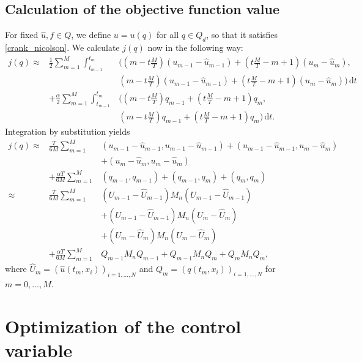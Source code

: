 \subsection{\label{subsectionCalculationOfTheObjectiveFunctionValue}Calculation of the objective function value}
For fixed $\hat{u},f\in Q$, we define $u=u(q)$ for all $q\in Q_d$, so that it satisfies \eqref{crank_nicolson}. We calculate $j(q)$ now in the following way:
\begin{eqnarray*}
j(q) \approx& \frac{1}{2}\sum_{m=1}^M\int_{t_{m-1}}^{t_m}&\bigg(\left(m-t\frac{M}{T}\right) \left(u_{m-1}-\hat{u}_{m-1}\right)+\left(t\frac{M}{T}-m+1\right) \left(u_{m}-\hat{u}_{m}\right),\\
&&\left(m-t\frac{M}{T}\right) \left(u_{m-1}-\hat{u}_{m-1}\right)+\left(t\frac{M}{T}-m+1\right) \left(u_{m}-\hat{u}_{m}\right)\bigg)\,\mathrm{d}t\\
&+ \frac{\alpha}{2}\sum_{m=1}^M\int_{t_{m-1}}^{t_m}&\bigg(\left(m-t\frac{M}{T}\right) q_{m-1}+\left(t\frac{M}{T}-m+1\right) q_{m},\\
&&\left(m-t\frac{M}{T}\right) q_{m-1}+\left(t\frac{M}{T}-m+1\right) q_{m}\bigg)\,\mathrm{d}t.
\end{eqnarray*}
Integration by substitution yields
\begin{eqnarray*}
j(q) \approx& \frac{T}{6M}\sum_{m=1}^M&\left(u_{m-1}-\hat{u}_{m-1},u_{m-1}-\hat{u}_{m-1}\right) + \left(u_{m-1}-\hat{u}_{m-1},u_{m}-\hat{u}_{m}\right)\\
&&+ \left(u_{m}-\hat{u}_{m},u_{m}-\hat{u}_{m}\right)\\
&+ \frac{\alpha T}{6M}\sum_{m=1}^M&\left(q_{m-1},q_{m-1}\right) + \left(q_{m-1},q_{m}\right) + \left(q_{m},q_{m}\right)\\
\approx& \frac{T}{6M}\sum_{m=1}^M&\left(U_{m-1}-\hat{U}_{m-1}\right)M_n\left(U_{m-1}-\hat{U}_{m-1}\right)\\
&&+ \left(U_{m-1}-\hat{U}_{m-1}\right)M_n\left(U_{m}-\hat{U}_{m}\right)\\
&&+ \left(U_{m}-\hat{U}_{m}\right)M_n\left(U_{m}-\hat{U}_{m}\right)\\
&+ \frac{\alpha T}{6M}\sum_{m=1}^M&Q_{m-1}M_nQ_{m-1} + Q_{m-1}M_nQ_{m} + Q_{m}M_nQ_{m},
\end{eqnarray*}
where $\hat{U}_m=\left(\hat{u}(t_m, x_i)\right)_{i=1,\dotsc,N}$ and $Q_m=\left(q(t_m, x_i)\right)_{i=1,\dotsc,N}$ for $m=0,\dotsc,M$.

\section{Optimization of the control variable}

